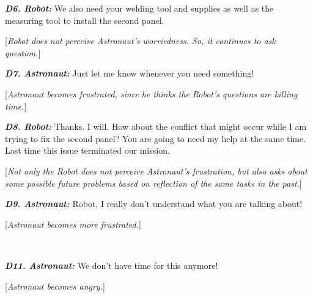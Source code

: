 \begin{spacing}{1.2}
{\begin{description}
  \item \textit{\textbf{D6. Robot:}} We also need your welding tool and supplies
  as well as the measuring tool to install the second panel.
  
  [\textit{Robot does not perceive Astronaut's worriedness. So, it continues to
  ask question.}]\\
  
  \item \textit{\textbf{D7. Astronaut:}} Just let me know whenever you need
  something!
  
  [\textit{Astronaut becomes frustrated, since he thinks the Robot's questions
  are killing time.}]\\
  
  \item \textit{\textbf{D8. Robot:}} Thanks. I will. How about the conflict that
  might occur while I am trying to fix the second panel? You are going to need
  my help at the same time. Last time this issue terminated our mission.
  
  [\textit{Not only the Robot does not perceive Astronaut's frustration, but
  also asks about some possible future problems based on reflection of the same
  tasks in the past.}]\\
  
  \item \textit{\textbf{D9. Astronaut:}} Robot, I really don't understand what
  you are talking about!
  
  [\textit{Astronaut becomes more frustrated.}]\\
  
  \item {}\\

  \item \textit{\textbf{D11. Astronaut:}} We don't have time for this anymore!
  
  [\textit{Astronaut becomes angry.}]\\

\end{description}
}
\end{spacing}

